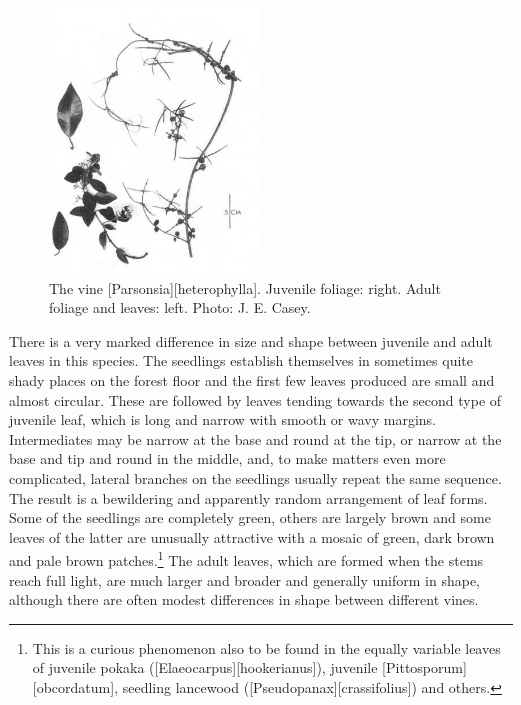 \begin{figure}
	\includegraphics[width=0.5\textwidth]{graphics/figure34parsonsia.jpg}
	\centering
	\caption[The vine \emph{Parsonsia heterophylla}]{The vine [Parsonsia][heterophylla]. Juvenile foliage: right. Adult foliage and leaves: left. Photo: J. E. Casey.}%
	\label{fig:34parsonsia}
\end{figure}

There is a very marked difference in size and shape between juvenile and adult leaves in this species.
The seedlings establish themselves in sometimes quite shady places on the forest floor and the first few leaves produced are small and almost circular.
These are followed by leaves tending towards the second type of juvenile leaf, which is long and narrow with smooth or wavy margins.
Intermediates may be narrow at the base and round at the tip, or narrow at the base and tip and round in the middle, and, to make matters even more complicated, lateral branches on the seedlings usually repeat the same sequence.
The result is a bewildering and apparently random arrangement of leaf forms.
Some of the seedlings are completely green, others are largely brown and some leaves of the latter are unusually attractive with a mosaic of green, dark brown and pale brown patches.\footnote{This is a curious phenomenon also to be found in the equally variable leaves of juvenile pokaka ([Elaeocarpus][hookerianus]), juvenile [Pittosporum][obcordatum], seedling lancewood ([Pseudopanax][crassifolius]) and others.}
The adult leaves, which are formed when the stems reach full light, are much larger and broader and generally uniform in shape, although there are often modest differences in shape between different vines.

